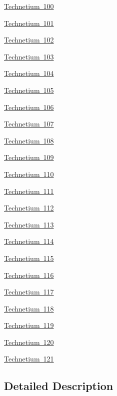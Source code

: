 \begin{DoxyCompactItemize}
\item 
\mbox{\hyperlink{group___isotope_const-_technetium-_tc100}{Technetium 100}}
\item 
\mbox{\hyperlink{group___isotope_const-_technetium-_tc101}{Technetium 101}}
\item 
\mbox{\hyperlink{group___isotope_const-_technetium-_tc102}{Technetium 102}}
\item 
\mbox{\hyperlink{group___isotope_const-_technetium-_tc103}{Technetium 103}}
\item 
\mbox{\hyperlink{group___isotope_const-_technetium-_tc104}{Technetium 104}}
\item 
\mbox{\hyperlink{group___isotope_const-_technetium-_tc105}{Technetium 105}}
\item 
\mbox{\hyperlink{group___isotope_const-_technetium-_tc106}{Technetium 106}}
\item 
\mbox{\hyperlink{group___isotope_const-_technetium-_tc107}{Technetium 107}}
\item 
\mbox{\hyperlink{group___isotope_const-_technetium-_tc108}{Technetium 108}}
\item 
\mbox{\hyperlink{group___isotope_const-_technetium-_tc109}{Technetium 109}}
\item 
\mbox{\hyperlink{group___isotope_const-_technetium-_tc110}{Technetium 110}}
\item 
\mbox{\hyperlink{group___isotope_const-_technetium-_tc111}{Technetium 111}}
\item 
\mbox{\hyperlink{group___isotope_const-_technetium-_tc112}{Technetium 112}}
\item 
\mbox{\hyperlink{group___isotope_const-_technetium-_tc113}{Technetium 113}}
\item 
\mbox{\hyperlink{group___isotope_const-_technetium-_tc114}{Technetium 114}}
\item 
\mbox{\hyperlink{group___isotope_const-_technetium-_tc115}{Technetium 115}}
\item 
\mbox{\hyperlink{group___isotope_const-_technetium-_tc116}{Technetium 116}}
\item 
\mbox{\hyperlink{group___isotope_const-_technetium-_tc117}{Technetium 117}}
\item 
\mbox{\hyperlink{group___isotope_const-_technetium-_tc118}{Technetium 118}}
\item 
\mbox{\hyperlink{group___isotope_const-_technetium-_tc119}{Technetium 119}}
\item 
\mbox{\hyperlink{group___isotope_const-_technetium-_tc120}{Technetium 120}}
\item 
\mbox{\hyperlink{group___isotope_const-_technetium-_tc121}{Technetium 121}}
\end{DoxyCompactItemize}


\subsection{Detailed Description}
